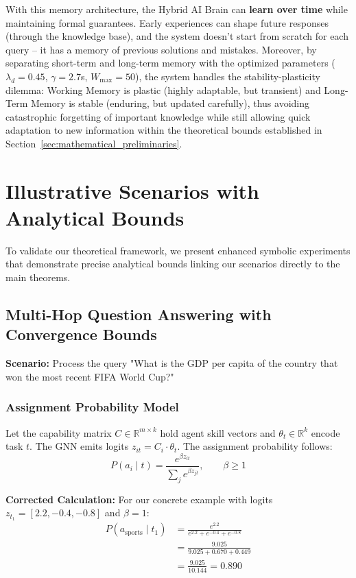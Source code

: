 \documentclass{article}
\begin{document}
With this memory architecture, the Hybrid AI Brain can \textbf{learn over time} while maintaining formal guarantees. Early experiences can shape future responses (through the knowledge base), and the system doesn't start from scratch for each query – it has a memory of previous solutions and mistakes. Moreover, by separating short-term and long-term memory with the optimized parameters ($\lambda_d = 0.45$, $\gamma = 2.7$s, $W_{\max} = 50$), the system handles the stability-plasticity dilemma: Working Memory is plastic (highly adaptable, but transient) and Long-Term Memory is stable (enduring, but updated carefully), thus avoiding catastrophic forgetting of important knowledge while still allowing quick adaptation to new information within the theoretical bounds established in Section~\ref{sec:mathematical_preliminaries}.

\section{Illustrative Scenarios with Analytical Bounds}
\label{sec:illustrative_scenarios}

To validate our theoretical framework, we present enhanced symbolic experiments that demonstrate precise analytical bounds linking our scenarios directly to the main theorems.

\subsection{Multi-Hop Question Answering with Convergence Bounds}

\textbf{Scenario:} Process the query "What is the GDP per capita of the country that won the most recent FIFA World Cup?" 

\subsubsection{Assignment Probability Model}

Let the capability matrix $C \in \mathbb{R}^{m \times k}$ hold agent skill vectors and $\theta_t \in \mathbb{R}^k$ encode task $t$. The GNN emits logits $z_{it} = C_i \cdot \theta_t$. The assignment probability follows:
\begin{equation}
P(a_i \mid t) = \frac{e^{\beta z_{it}}}{\sum_j e^{\beta z_{jt}}}, \qquad \beta \geq 1
\end{equation}

\textbf{Corrected Calculation:} For our concrete example with logits $z_{t_1} = [2.2, -0.4, -0.8]$ and $\beta = 1$:
\begin{align}
P(a_{\text{sports}} \mid t_1) &= \frac{e^{2.2}}{e^{2.2} + e^{-0.4} + e^{-0.8}}\\
&= \frac{9.025}{9.025 + 0.670 + 0.449}\\
&= \frac{9.025}{10.144} = 0.890
\end{align}
\end{document}
